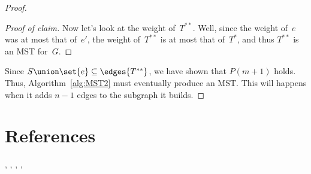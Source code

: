 \begin{proof}
\begin{proof}[Proof of claim]
Now let's look at the weight of~$T^{**}$.  Well, since the weight
of~$e$ was at most that of~$e'$, the weight of~$T^{**}$ is at most
that of~$T^*$, and thus $T^{**}$ is an MST for~$G$.
\end{proof}

Since $S \union \set{e} \subseteq \edges{T^{**}}$, we have shown that
  $P(m + 1)$ holds.  Thus, Algorithm~\ref{alg:MST2} must eventually
  produce an MST\@.  This will happens when it adds $n - 1$ edges to
  the subgraph it builds.
\end{proof}
\fi

\begin{problems}
  \practiceproblems

  \examproblems

  \classproblems

  \homeworkproblems

\end{problems}

\section{References}

\cite{Bollobas98},      %
\cite{Diestel2000},
\cite{GoodaireP2001},
\cite{Gusfield1989},
\cite{HartsfieldR2003}

\endinput
